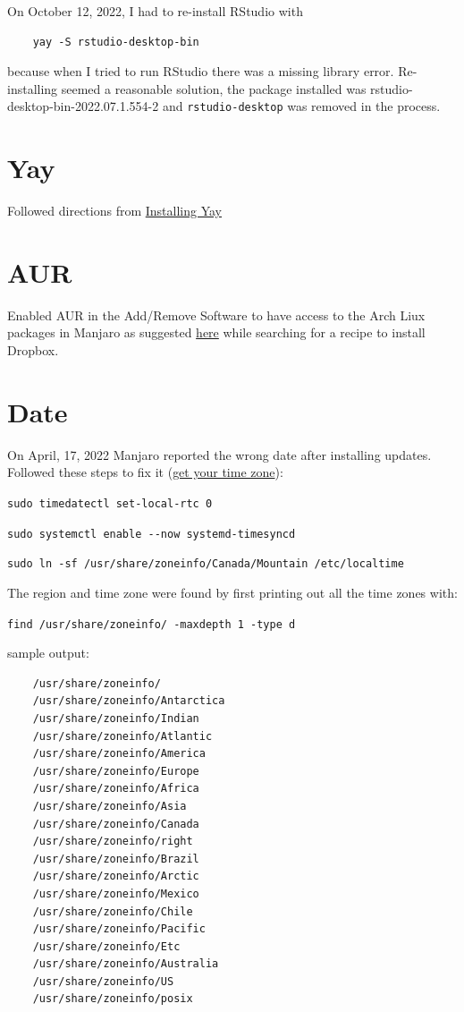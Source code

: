 \documentclass[]{scrartcl}
\begin{document}
On October 12, 2022, I had to re-install RStudio with
\begin{verbatim}
	yay -S rstudio-desktop-bin
\end{verbatim}

because when I tried to run RStudio there was a missing library error. 
Re-installing seemed a reasonable solution, the package installed was rstudio-desktop-bin-2022.07.1.554-2 and \texttt{rstudio-desktop} was removed in the process.

\section{Yay}
\label{sec:yay}

Followed directions from \href{https://www.tecmint.com/install-yay-aur-helper-in-arch-linux-and-manjaro/}{Installing Yay}

\section{AUR}

Enabled AUR in the Add/Remove Software to have access to the Arch Liux packages in Manjaro as suggested \href{https://forum.manjaro.org/t/dropbox-install-new-to-manjaro/9576/5}{here} while searching for a recipe to install Dropbox.

\section{Date}

On April, 17, 2022 Manjaro reported the wrong date after installing updates.
Followed these steps to fix it (\href{https://archived.forum.manjaro.org/t/howto-get-your-time-timezone-right-using-manjaro-windows-dual-boot/89359}{get your time zone}):
\begin{compactenum}
	\item  \verb|sudo timedatectl set-local-rtc 0|
	\item \verb|sudo systemctl enable --now systemd-timesyncd|
	\item \verb|sudo ln -sf /usr/share/zoneinfo/Canada/Mountain /etc/localtime|
\end{compactenum}

The region and time zone were found by first printing out all the time zones with:

\verb|find /usr/share/zoneinfo/ -maxdepth 1 -type d|

sample output:

\begin{verbatim}
	/usr/share/zoneinfo/
	/usr/share/zoneinfo/Antarctica
	/usr/share/zoneinfo/Indian
	/usr/share/zoneinfo/Atlantic
	/usr/share/zoneinfo/America
	/usr/share/zoneinfo/Europe
	/usr/share/zoneinfo/Africa
	/usr/share/zoneinfo/Asia
	/usr/share/zoneinfo/Canada
	/usr/share/zoneinfo/right
	/usr/share/zoneinfo/Brazil
	/usr/share/zoneinfo/Arctic
	/usr/share/zoneinfo/Mexico
	/usr/share/zoneinfo/Chile
	/usr/share/zoneinfo/Pacific
	/usr/share/zoneinfo/Etc
	/usr/share/zoneinfo/Australia
	/usr/share/zoneinfo/US
	/usr/share/zoneinfo/posix
\end{verbatim}
\end{document}
